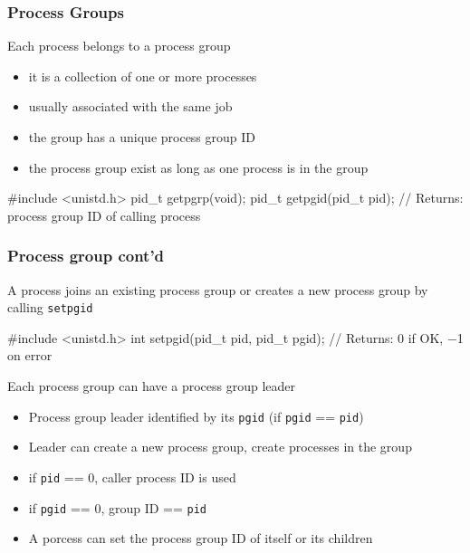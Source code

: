 \documentclass[newPxFont,sthlmFooter,nooffset]{beamer}
\begin{document}
\begin{frame}[containsverbatim,t]
  \frametitle{Process Groups}
Each process belongs to a process group
\begin{itemize}
\item it is a collection of one or more processes
\item usually associated with the same job
\item the group has a unique process group ID
\item the process group exist as long as one process is in the group
\end{itemize}

\begin{codedef}
#include <unistd.h>
pid_t getpgrp(void);
pid_t getpgid(pid_t pid); 
// Returns: process group ID of calling process
\end{codedef}

\end{frame}

\begin{frame}[containsverbatim,t]
  \frametitle{Process group cont'd}
A process joins an existing process group or creates a new process group by calling \texttt{setpgid}
\begin{codedef}
#include <unistd.h>
int setpgid(pid_t pid, pid_t pgid);
// Returns: 0 if OK, −1 on error
\end{codedef}

Each process group can have a process group leader
\begin{itemize}
\item Process group leader identified by its \texttt{pgid} (if \texttt {pgid} == \texttt{pid})
\item Leader can create a new process group, create processes in the group
\item if \texttt{pid} == 0, caller process ID is used
\item if \texttt{pgid} == 0, group ID == \texttt{pid}
\item A porcess can set the process group ID of itself or its children
\end{itemize}
\end{frame}
\end{document}
